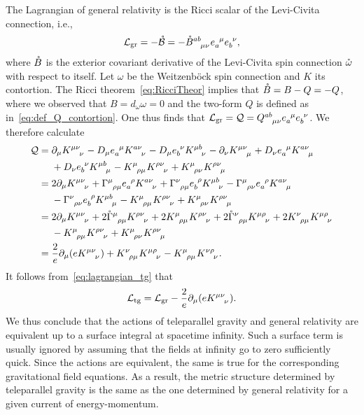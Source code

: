 \documentclass[
final,
11pt,
a4paper,
DIV=11,
headinclude=true,
footinclude=false,
bibliography=totoc,
twoside=true,  %
BCOR=5mm
]{scrbook}
\begin{document}
The Lagrangian of general relativity is the Ricci scalar of the 
Levi-Civita connection, i.e.,
\begin{equation*}
  \mc{L}_\mrm{gr} = -\mring{\mc{B}} 
  = -\mring{B}\ind{^{ab}_{\mu\nu}} e\ind{_a^\mu} e\ind{_b^\nu},
\end{equation*}
where $\mathring{B}$ is the exterior covariant derivative of the 
Levi-Civita spin connection $\mathring{\omega}$ with respect to 
itself. Let $\omega$ be the Weitzenb\"ock spin connection and $K$ 
its contortion. The Ricci theorem~\eqref{eq:RicciTheor} implies 
that $\mathring{B} = B - Q = -Q$, where we observed that $B 
= d_\omega \omega = 0$ and the two-form $Q$ is defined as 
in~\eqref{eq:def_Q_contortion}. One thus finds that 
$\mc{L}_\mrm{gr} = \mc{Q} = Q\ind{^{ab}_{\mu\nu}} e\ind{_a^\mu} 
e\ind{_b^\nu}$. We therefore calculate
\begin{align*}
  \mathcal{Q} &= \pd_\mu K\ind{^{\mu\nu}_\nu} - D_\mu 
  e\ind{_a^\mu} K\ind{^{a\nu}_\nu} - D_\mu e\ind{_b^\nu} 
  K\ind{^{\mu b}_\nu} - \pd_\nu K\ind{^{\mu\nu}_\mu} 
  + D_\nu e\ind{_a^\mu} K\ind{^{a\nu}_\mu}  \\
  &\nla{}+ D_\nu e\ind{_b^\nu} K\ind{^{\mu b}_\mu} 
  - K\ind{^\mu_{\rho \mu}} K\ind{^{\rho\nu}_\nu} + 
  K\ind{^\mu_{\rho \nu}} K\ind{^{\rho\nu}_\mu} \\
  &= 2 \pd_\mu K\ind{^{\mu\nu}_\nu} + \Gamma\ind{^\mu_{\rho\mu}} 
  e\ind{_a^\rho} K\ind{^{a\nu}_\nu} + \Gamma\ind{^\nu_{\rho\mu}} 
  e\ind{_b^\rho} K\ind{^{\mu b}_\nu} - \Gamma\ind{^\mu_{\rho\nu}} 
  e\ind{_a^\rho} K\ind{^{a \nu}_\mu} 
  \\
  &\nla{}- \Gamma\ind{^\nu_{\rho\nu}} e\ind{_b^\rho}
  K\ind{^{\mu b}_\mu} - K\ind{^\mu_{\rho \mu}} 
  K\ind{^{\rho\nu}_\nu} + K\ind{^\mu_{\rho \nu}} 
  K\ind{^{\rho\nu}_\mu} \\
  &= 2 \pd_\mu K\ind{^{\mu\nu}_\nu} + 2 
  \mathring{\Gamma}\ind{^\mu_{\rho\mu}} K\ind{^{\rho\nu}_\nu} + 
  2 K\ind{^\mu_{\rho \mu}} K\ind{^{\rho\nu}_\nu} + 2 
  \mathring{\Gamma}\ind{^\nu_{\rho\mu}} K\ind{^{\mu\rho}_\nu} + 
  2 K\ind{^\nu_{\rho\mu}} K\ind{^{\mu\rho}_\nu} \\
  &\nla{}- K\ind{^\mu_{\rho \mu}} K\ind{^{\rho\nu}_\nu} + 
  K\ind{^\mu_{\rho \nu}} K\ind{^{\rho\nu}_\mu} \\
  &= \frac{2}{e} \pd_\mu( e K\ind{^{\mu\nu}_\nu}) + 
  K\ind{^\nu_{\rho\mu}} K\ind{^{\mu\rho}_\nu} - K\ind{^\mu_{\rho 
      \mu}} K\ind{^{\nu\rho}_\nu}.
\end{align*}
It follows from~\eqref{eq:lagrangian_tg} that
\begin{equation}
  \mc{L}_\mrm{tg} = \mc{L}_\mrm{gr} - \frac{2}{e} \pd_\mu( 
  e K\ind{^{\mu\nu}_\nu}).
\end{equation}
We thus conclude that the actions of teleparallel gravity and 
general relativity are equivalent up to a surface integral at 
spacetime infinity. Such a surface term is usually ignored by 
assuming that the fields at infinity go to zero sufficiently 
quick. Since the actions are equivalent, the same is true for the 
corresponding gravitational field equations. As a result, the 
metric structure determined by teleparallel gravity is the same 
as the one determined by general relativity for a given current 
of energy-momentum.
\end{document}
